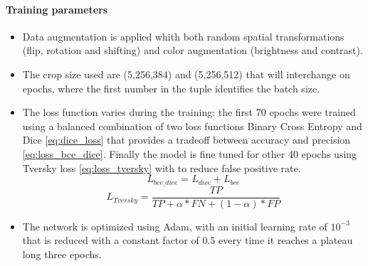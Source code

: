 \documentclass[10pt,twocolumn,letterpaper]{article}
\begin{document}
      \paragraph{Training parameters}
         \begin{itemize}
            \item Data augmentation is applied whith both random spatial transformations (flip, rotation and shifting) and color augmentation (brightness and contrast).
            \item The crop size used are (5,256,384) and (5,256,512) that will interchange on epochs, where the first number in the tuple identifies the batch size.
            \item The loss function varies during the training: the first 70 epochs were trained using a balanced combination of two loss functions Binary Cross Entropy and Dice \eqref{eq:dice_loss} that provides a tradeoff between accuracy and precision \eqref{eq:loss_bce_dice}. Finally the model is fine tuned for other 40 epochs using Tversky loss \eqref{eq:loss_tversky} with  to reduce false positive rate. 
            \begin{equation}\label{eq:loss_bce_dice}
               L_{bce\_dice} = L_{dice} + L_{bce}
            \end{equation}
            \begin{equation}\label{eq:loss_tversky}
               L_{Tversky} = \frac{TP}{TP + \alpha*FN + (1-\alpha)*FP}
            \end{equation}
            \item The network is optimized using Adam, with an initial learning rate of $ 10^{-3} $ that is reduced with a constant factor of 0.5 every time it reaches a plateau long three epochs.
         \end{itemize}
\end{document}
